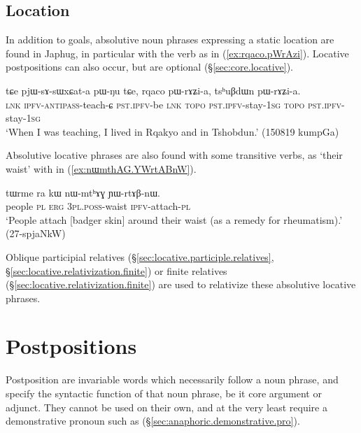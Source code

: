 \subsection{Location} \label{absolutive.locative}
 
In addition to goals, absolutive noun phrases expressing a static location are found in Japhug, in particular with the verb  as in (\ref{ex:rqaco.pWrAzi}).  Locative postpositions can also occur, but are optional (§\ref{sec:core.locative}).

\begin{exe}
\ex \label{ex:rqaco.pWrAzi}
 \gll  tɕe pjɯ-sɤ-sɯxɕat-a pɯ-ŋu tɕe, rqaco pɯ-rɤʑi-a, tsʰuβdɯn pɯ-rɤʑi-a. \\
 \textsc{lnk} \textsc{ipfv}-\textsc{antipass}-teach-ɕ \textsc{pst}.\textsc{ipfv}-be \textsc{lnk}  \textsc{topo} \textsc{pst}.\textsc{ipfv}-stay-\textsc{1sg}  \textsc{topo} \textsc{pst}.\textsc{ipfv}-stay-\textsc{1sg}  \\
 \glt `When I was teaching, I lived in Rqakyo and in Tshobdun.' (150819 kumpGa) 
\end{exe}

Absolutive locative phrases are also found with some transitive verbs, as  `their waist' with  in (\ref{ex:nɯmthAG.YWrtABnW}). 

\begin{exe}
\ex \label{ex:nɯmthAG.YWrtABnW}
 \gll tɯrme ra kɯ nɯ-mtʰɤɣ ɲɯ-rtɤβ-nɯ. \\
 people \textsc{pl} \textsc{erg} \textsc{3pl}.\textsc{poss}-waist \textsc{ipfv}-attach-\textsc{pl} \\
 \glt `People attach [badger skin] around their waist (as a remedy for rheumatism).' (27-spjaNkW)
\end{exe}

Oblique participial relatives (§\ref{sec:locative.participle.relatives}, §\ref{sec:locative.relativization.finite}) or finite relatives (§\ref{sec:locative.relativization.finite}) are used to relativize these absolutive locative phrases.

\section{Postpositions} \label{ex:postpositions}
Postposition are invariable words which necessarily follow a noun phrase, and specify the syntactic function of that noun phrase, be it core argument or adjunct. They cannot be used on their own, and at the very least require a demonstrative pronoun such as  (§\ref{sec:anaphoric.demonstrative.pro}). 

